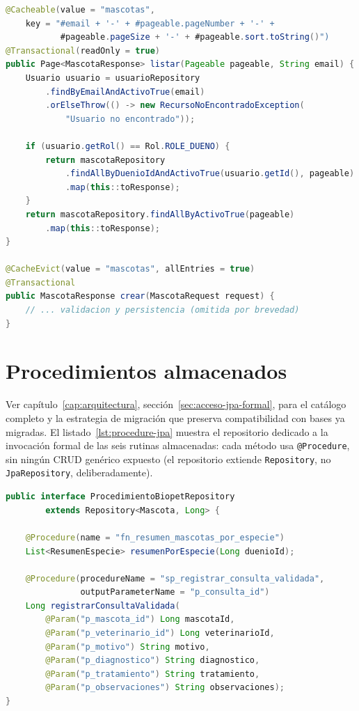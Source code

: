 \begin{lstlisting}[language=Java,caption={Patr\'on \emph{cache-aside} declarativo en \texttt{MascotaService.java} (fragmento real).},label={lst:cache-aside}]
@Cacheable(value = "mascotas",
    key = "#email + '-' + #pageable.pageNumber + '-' +
           #pageable.pageSize + '-' + #pageable.sort.toString()")
@Transactional(readOnly = true)
public Page<MascotaResponse> listar(Pageable pageable, String email) {
    Usuario usuario = usuarioRepository
        .findByEmailAndActivoTrue(email)
        .orElseThrow(() -> new RecursoNoEncontradoException(
            "Usuario no encontrado"));

    if (usuario.getRol() == Rol.ROLE_DUENO) {
        return mascotaRepository
            .findAllByDuenioIdAndActivoTrue(usuario.getId(), pageable)
            .map(this::toResponse);
    }
    return mascotaRepository.findAllByActivoTrue(pageable)
        .map(this::toResponse);
}

@CacheEvict(value = "mascotas", allEntries = true)
@Transactional
public MascotaResponse crear(MascotaRequest request) {
    // ... validacion y persistencia (omitida por brevedad)
}
\end{lstlisting}

\section{Procedimientos almacenados}

Ver cap\'itulo~\ref{cap:arquitectura}, secci\'on~\ref{sec:acceso-jpa-formal},
para el cat\'alogo completo y la estrategia de migraci\'on que preserva
compatibilidad con bases ya migradas. El listado~\ref{lst:procedure-jpa}
muestra el repositorio dedicado a la invocaci\'on formal de las seis
rutinas almacenadas: cada m\'etodo usa \texttt{@Procedure}, sin ning\'un
CRUD gen\'erico expuesto (el repositorio extiende \texttt{Repository}, no
\texttt{JpaRepository}, deliberadamente).

\begin{lstlisting}[language=Java,caption={Acceso JPA formal a procedimientos almacenados en \texttt{Procedimiento\allowbreak BiopetRepository.\allowbreak java}.},label={lst:procedure-jpa}]
public interface ProcedimientoBiopetRepository
        extends Repository<Mascota, Long> {

    @Procedure(name = "fn_resumen_mascotas_por_especie")
    List<ResumenEspecie> resumenPorEspecie(Long duenioId);

    @Procedure(procedureName = "sp_registrar_consulta_validada",
               outputParameterName = "p_consulta_id")
    Long registrarConsultaValidada(
        @Param("p_mascota_id") Long mascotaId,
        @Param("p_veterinario_id") Long veterinarioId,
        @Param("p_motivo") String motivo,
        @Param("p_diagnostico") String diagnostico,
        @Param("p_tratamiento") String tratamiento,
        @Param("p_observaciones") String observaciones);
}
\end{lstlisting}


